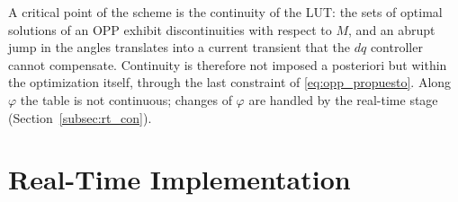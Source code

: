 \documentclass[conference]{IEEEtran}
\newcommand{\old}[1]{\par\smallskip\noindent{\color{gray}\footnotesize
    \textbf{[ANTES]} #1}\par\smallskip}
\renewcommand{\old}[1]{}       %
\begin{document}
A critical point of the scheme is the continuity of the LUT: the sets of optimal
solutions of an OPP exhibit discontinuities with respect to $M$, and an abrupt
jump in the angles translates into a current transient that the $dq$ controller
cannot compensate. Continuity is therefore not imposed a posteriori but within
the optimization itself, through the last constraint of
\eqref{eq:opp_propuesto}. Along $\varphi$ the table is not continuous;
changes of $\varphi$ are handled by the real-time stage
(Section~\ref{subsec:rt_con}).
\old{In operation, the real-time stage reinforces it: each update starts
from the previous angles with a step bounded by the proximal term, so
changes of $M$ are followed without jumps between table entries, while a
change of $\varphi$ across a table cell re-seeds the optimizer, with
hysteresis at the cell boundaries.}


\section{Real-Time Implementation}
\label{sec:rt}
\end{document}
